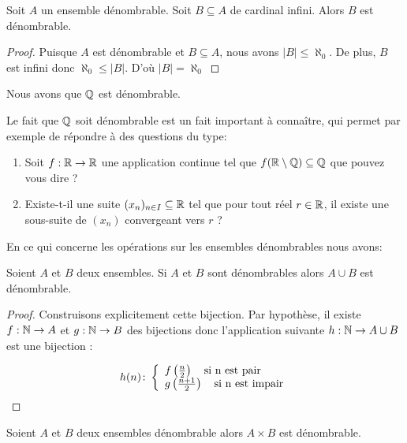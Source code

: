 \begin{proposition}
    Soit $A$ un ensemble dénombrable. Soit $B\subseteq A$ de cardinal infini. Alors $B$ est dénombrable.
\end{proposition}

\begin{proof}
Puisque $A$ est dénombrable et $B\subseteq A$, nous avons $|B|\leq \aleph_0$. De plus, $B$ est infini donc $\aleph_0 \leq |B|$. D'où $|B|= \aleph_0$
\end{proof}


\begin{corollaire}
    Nous avons que $\mathbb{Q}$ est dénombrable.
\end{corollaire}

\begin{remarque}
    Le fait que $\mathbb{Q}$ soit dénombrable est un fait important à connaître, qui permet par exemple de répondre à des questions du type:
    \begin{enumerate}
        \item Soit $f:\mathbb{R} \to \mathbb{R}$ une application continue tel que $f(\mathbb{R} \setminus \mathbb{Q}) \subseteq \mathbb{Q}$ que pouvez vous dire ?
        \item Existe-t-il une suite $(x_n)_{n\in I}\subseteq \mathbb{R}$ tel que pour tout réel $r\in \mathbb{R}$, il existe une sous-suite de $(x_n)$ convergeant vers $r$ ?
    \end{enumerate}
\end{remarque}


En ce qui concerne les opérations sur les ensembles dénombrables nous avons:

\begin{proposition}
    Soient $A$ et $B$ deux ensembles. Si $A$ et $B$ sont dénombrables alors $A\cup B$ est dénombrable.
\end{proposition}

\begin{proof}
    Construisons explicitement cette bijection. Par hypothèse, il existe $f:\mathbb{N} \to A$ et $g:\mathbb{N}\to B$ des bijections donc l'application suivante $h:\mathbb{N}\to A\cup B$ est une bijection :

    $$
h(n)\colon \left\{\begin{array}{l}f\left(\frac{n}{2}\right) \quad \text{si n est pair} \\g\left(\frac{n+1}{2}\right) \quad \text{si n est impair}\end{array}\right.
$$
\end{proof}

\begin{proposition}
    Soient $A$ et $B$ deux ensembles dénombrable alors $A\times B$ est dénombrable.
\end{proposition}

